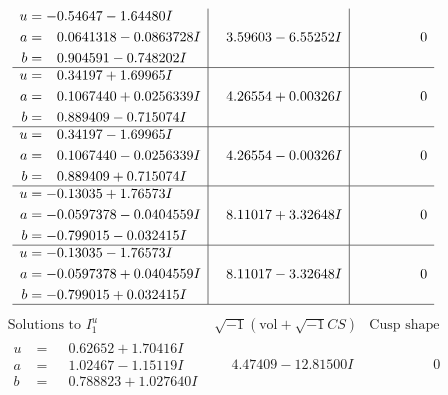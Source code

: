 \documentclass[1p]{elsarticle_modified}
\theoremstyle{definition}
\newcommand{\I}{\sqrt{-1}}
\begin{document}
$$\begin{array}{c|c|c}
\begin{aligned}
u &= -0.54647 - 1.64480 I \\
a &= \phantom{-}0.0641318 - 0.0863728 I \\
b &= \phantom{-}0.904591 - 0.748202 I\end{aligned}
 & \phantom{-}3.59603 - 6.55252 I & \phantom{-0.000000 } 0 \\ \hline\begin{aligned}
u &= \phantom{-}0.34197 + 1.69965 I \\
a &= \phantom{-}0.1067440 + 0.0256339 I \\
b &= \phantom{-}0.889409 - 0.715074 I\end{aligned}
 & \phantom{-}4.26554 + 0.00326 I & \phantom{-0.000000 } 0 \\ \hline\begin{aligned}
u &= \phantom{-}0.34197 - 1.69965 I \\
a &= \phantom{-}0.1067440 - 0.0256339 I \\
b &= \phantom{-}0.889409 + 0.715074 I\end{aligned}
 & \phantom{-}4.26554 - 0.00326 I & \phantom{-0.000000 } 0 \\ \hline\begin{aligned}
u &= -0.13035 + 1.76573 I \\
a &= -0.0597378 - 0.0404559 I \\
b &= -0.799015 - 0.032415 I\end{aligned}
 & \phantom{-}8.11017 + 3.32648 I & \phantom{-0.000000 } 0 \\ \hline\begin{aligned}
u &= -0.13035 - 1.76573 I \\
a &= -0.0597378 + 0.0404559 I \\
b &= -0.799015 + 0.032415 I\end{aligned}
 & \phantom{-}8.11017 - 3.32648 I & \phantom{-0.000000 } 0\\
 \hline 
 \end{array}$$\newpage$$\begin{array}{c|c|c}  
\text{Solutions to }I^u_{1}& \I (\text{vol} + \sqrt{-1}CS) & \text{Cusp shape}\\
 \hline 
\begin{aligned}
u &= \phantom{-}0.62652 + 1.70416 I \\
a &= \phantom{-}1.02467 - 1.15119 I \\
b &= \phantom{-}0.788823 + 1.027640 I\end{aligned}
 & \phantom{-}4.47409 - 12.81500 I & \phantom{-0.000000 } 0 \\ \hline\begin{aligned}

\end{aligned}
\end{array}$$
\end{document}
